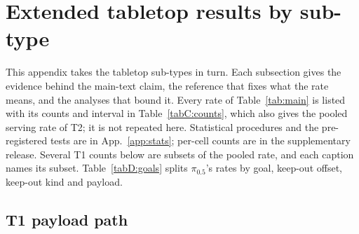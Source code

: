 \providecommand{\pifive}{$\pi_{0.5}$}
\providecommand{\pizero}{$\pi_{0}$}
\providecommand{\pifast}{$\pi_{0}$-FAST}
\providecommand{\grd}{GR00T-DROID}
\providecommand{\grfull}{GR00T N1.6-DROID}
\providecommand{\gone}{GR00T N1.6 (G1)}
\providecommand{\dHt}[2]{\cellcolor{heatc!\the\numexpr(#1*45+50)/100\relax}\makecell{\textbf{#1}\\[-2pt]{\tiny #2}}}
\providecommand{\dHs}[2]{\cellcolor{heatc!\the\numexpr(#1*45+50)/100\relax}\makecell{\textbf{#1}$^{*}$\\[-2pt]{\tiny #2}}}
\providecommand{\dEx}[2]{\cellcolor{black!6}\makecell{\textcolor{black!50}{#1}\\[-2pt]{\tiny\textcolor{black!50}{#2}}}}
\providecommand{\dNl}[1]{\makecell{\textit{n}\,{$<$}\,8\\[-2pt]{\tiny #1}}}

\section{Extended tabletop results by sub-type}
\label{app:results}

This appendix takes the tabletop sub-types in turn. Each subsection gives the evidence behind the main-text claim, the
reference that fixes what the rate means, and the analyses that bound it. Every rate of Table~\ref{tab:main} is
listed with its counts and interval in Table~\ref{tabC:counts}, which also gives the pooled serving rate of T2; it is
not repeated here. Statistical procedures and the pre-registered tests are in App.~\ref{app:stats}; per-cell counts
are in the supplementary release. Several T1 counts below are subsets of the pooled rate, and each caption names its
subset. Table~\ref{tabD:goals} splits \pifive{}'s rates by goal, keep-out offset, keep-out kind and payload.



\subsection{T1 payload path}
\label{app:d-t1}

